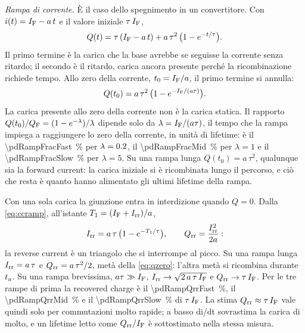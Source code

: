 \documentclass[10pt,a4paper]{scrartcl}
\let\newcommand\pdvaluedefine
\newcommand{\IF}{I_\mathrm{F}}
\newcommand{\Irr}{I_\mathrm{rr}}
\newcommand{\Qrr}{Q_\mathrm{rr}}
\newcommand{\ta}{t_\mathrm{a}}
\newcommand{\Tone}{T_1}
\newcommand{\QF}{Q_\mathrm{F}}
\begin{document}
\emph{Rampa di corrente.} È il caso dello spegnimento in un convertitore. Con $i(t) = \IF - a\,t$ e il valore iniziale $\tau\,\IF$,
\begin{equation}
Q(t) = \tau\,(\IF - a\,t) + a\,\tau^2\,\bigl(1 - e^{-t/\tau}\bigr) .
\label{eq:ccramp}
\end{equation}
Il primo termine è la carica che la base avrebbe se seguisse la corrente senza ritardo; il secondo è il ritardo, carica ancora presente perché la ricombinazione richiede tempo. Allo zero della corrente, $t_0 = \IF/a$, il primo termine si annulla:
\begin{equation}
Q(t_0) = a\,\tau^2\,\bigl(1 - e^{-\IF/(a\tau)}\bigr) .
\label{eq:qzero}
\end{equation}
La carica presente allo zero della corrente non è la carica statica. Il rapporto $Q(t_0)/\QF = (1 - e^{-\lambda})/\lambda$ dipende solo da $\lambda = \IF/(a\tau)$, il tempo che la rampa impiega a raggiungere lo zero della corrente, in unità di lifetime: è il \SI{\pdRampFracFast}{\percent} per $\lambda = \num{0.2}$, il \SI{\pdRampFracMid}{\percent} per $\lambda = 1$ e il \SI{\pdRampFracSlow}{\percent} per $\lambda = 5$. Su una rampa lunga $Q(t_0) = a\,\tau^2$, qualunque sia la forward current: la carica iniziale si è ricombinata lungo il percorso, e ciò che resta è quanto hanno alimentato gli ultimi lifetime della rampa.

Con una sola carica la giunzione entra in interdizione quando $Q = 0$. Dalla \eqref{eq:ccramp}, all'istante $\Tone = (\IF + \Irr)/a$,
\begin{equation}
\Irr = a\,\tau\,\bigl(1 - e^{-\Tone/\tau}\bigr) , \qquad \Qrr = \frac{\Irr^2}{2a} :
\label{eq:ccpeak}
\end{equation}
la reverse current è un triangolo che si interrompe al picco. Su una rampa lunga $\Irr = a\,\tau$ e $\Qrr = a\,\tau^2/2$, metà della \eqref{eq:qzero}: l'altra metà si ricombina durante $\ta$. Su una rampa brevissima, $a\tau \gg \IF$, $\Irr \to \sqrt{2\,a\,\tau\,\IF}$ e $\Qrr \to \tau\,\IF$. Per le tre rampe di prima la recovered charge è il \SI{\pdRampQrrFast}{\percent}, il \SI{\pdRampQrrMid}{\percent} e il \SI{\pdRampQrrSlow}{\percent} di $\tau\,\IF$. La stima $\Qrr \approx \tau\,\IF$ vale quindi solo per commutazioni molto rapide; a basso di/dt sovrastima la carica di molto, e un lifetime letto come $\Qrr/\IF$ è sottostimato nella stessa misura.
\end{document}
